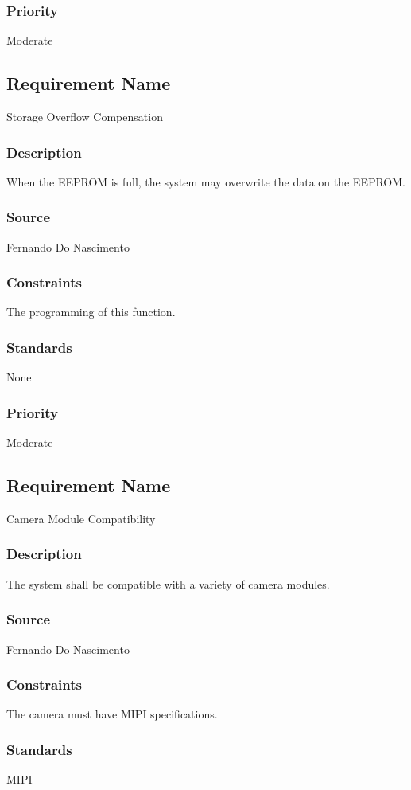 \subsubsection{Priority}
Moderate

\subsection{Requirement Name}
Storage Overflow Compensation
\subsubsection{Description}
When the EEPROM is full, the system may overwrite the data on the EEPROM.
\subsubsection{Source}
Fernando Do Nascimento
\subsubsection{Constraints}
The programming of this function.
\subsubsection{Standards}
None
\subsubsection{Priority}
Moderate

\subsection{Requirement Name}
Camera Module Compatibility
\subsubsection{Description}
The system shall be compatible with a variety of camera modules.
\subsubsection{Source}
Fernando Do Nascimento
\subsubsection{Constraints}
The camera must have MIPI specifications.
\subsubsection{Standards}
MIPI
